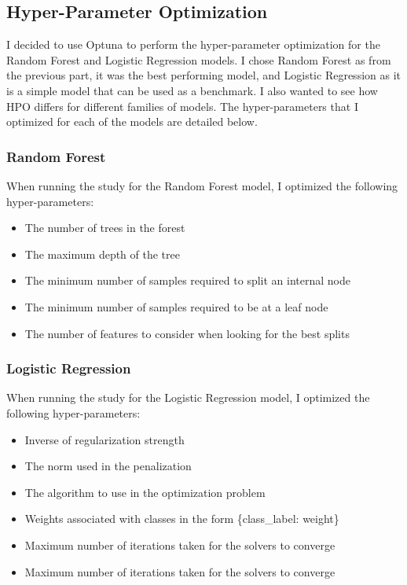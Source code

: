 \documentclass{article}
\begin{document}
\subsection{Hyper-Parameter Optimization}
I decided to use Optuna to perform the hyper-parameter optimization for the Random Forest and Logistic Regression models. I chose Random Forest as from the previous part, it was the best performing model, and Logistic Regression as it is a simple model that can be used as a benchmark. I also wanted to see how HPO differs for different families of models. The hyper-parameters that I optimized for each of the models are detailed below.

\subsubsection{Random Forest}
When running the study for the Random Forest model, I optimized the following hyper-parameters:

\begin{itemize}
  \item {} The number of trees in the forest
  \item {} The maximum depth of the tree
  \item {} The minimum number of samples required to split an internal node
  \item {} The minimum number of samples required to be at a leaf node
  \item {} The number of features to consider when looking for the best splits
\end{itemize}

\subsubsection{Logistic Regression}
When running the study for the Logistic Regression model, I optimized the following hyper-parameters:

\begin{itemize}
  \item {} Inverse of regularization strength
  \item {} The norm used in the penalization
  \item {} The algorithm to use in the optimization problem
  \item {} Weights associated with classes in the form \{class\_label: weight\}
  \item {} Maximum number of iterations taken for the solvers to converge
  \item {} Maximum number of iterations taken for the solvers to converge
\end{itemize}
\end{document}
